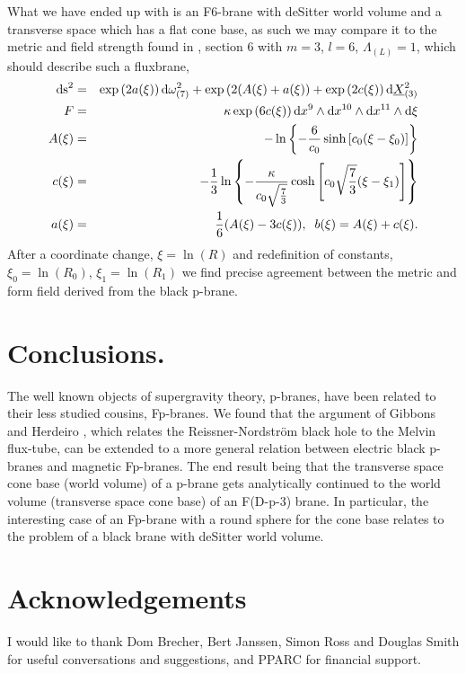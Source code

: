 \documentclass[a4paper,11pt]{article}
\begin{document}
What we have ended up with is an F6-brane with deSitter world volume and
a transverse space which has a flat cone base, as such we may compare
it to the metric and field strength found in
\cite{saffin01}, section 6 with $m=3$, $l=6$, $\Lambda_{(L)}=1$,
which should describe such a fluxbrane,
\begin{eqnarray}
{\rm ds}^2&=&\exp\left(2a(\xi)\right){\rm d}\omega^2_{(7)}
             +\exp\left(2(A(\xi)+a(\xi)\right)
             +\exp\left(2c(\xi)\right){\rm d}\underline{X}^2_{(3)}\\
F&=&\kappa\exp\left(6c(\xi)\right)
    {\rm d}x^9\wedge{\rm d}x^{10}\wedge{\rm d}x^{11}\wedge{\rm d}\xi\\
A(\xi)&=&-\ln\left\{-\frac{6}{c_0}\sinh\left[c_0(\xi-\xi_0)\right]\right\}\\
c(\xi)&=&-\frac{1}{3}\ln\left\{-\frac{\kappa}{c_0\sqrt{\frac{7}{3}}}
           \cosh\left[c_0\sqrt{\frac{7}{3}}(\xi-\xi_1)\right]\right\}\\
a(\xi)&=&\frac{1}{6}(A(\xi)-3c(\xi)),\;\;
b(\xi)=A(\xi)+c(\xi).
\end{eqnarray}
After a coordinate change, \mbox{$\xi=\ln (R)$} and redefinition
of constants,
\mbox{$\xi_0=\ln (R_0)$}, \mbox{$\xi_1=\ln (R_1)$} we find precise agreement
between the metric and form field derived from the black p-brane.

\setcounter{equation}{0}
\section{Conclusions.}

The well known objects of supergravity theory, p-branes, have been related
to their less studied cousins, Fp-branes. We found that
the argument of Gibbons and Herdeiro \cite{gibbons01},
which relates the Reissner-Nordstr\"{o}m black hole to the Melvin
flux-tube, can be extended to a more general relation between 
electric black p-branes
and magnetic Fp-branes. The end result being 
that the transverse space cone base (world volume) 
of a p-brane gets analytically continued to the world volume 
(transverse space cone base) of an F(D-p-3) brane.
In particular, the interesting case of an Fp-brane with
a round sphere for the cone base relates to the problem
of a black brane with deSitter world volume.



\section{Acknowledgements}
I would like to thank Dom Brecher, Bert Janssen,
Simon Ross and Douglas Smith for useful conversations
and suggestions, 
and PPARC for financial support.
\end{document}
